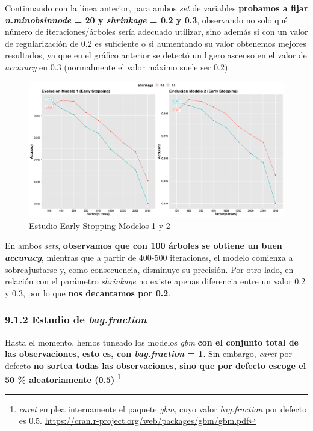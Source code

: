 \documentclass[
]{article}
\begin{document}
Continuando con la línea anterior, para ambos \emph{set} de variables
\textbf{probamos a fijar \emph{n.minobsinnode} = 20 y \emph{shrinkage} =
0.2 y 0.3}, observando no solo qué número de iteraciones/árboles sería
adecuado utilizar, sino además si con un valor de regularización de 0.2
es suficiente o si aumentando su valor obtenemos mejores resultados, ya
que en el gráfico anterior se detectó un ligero ascenso en el valor de
\emph{accuracy} en 0.3 (normalmente el valor máximo suele ser 0.2):

\begin{figure}[h!]

{\centering \includegraphics[width=0.99\linewidth,height=0.99\textheight,]{./charts/gradient_boosting/05_early_stopping} 

}

\caption{Estudio Early Stopping Modelos 1 y 2}\label{fig:unnamed-chunk-109}
\end{figure}

En ambos \emph{sets}, \textbf{observamos que con 100 árboles se obtiene
un buen \emph{accuracy}}, mientras que a partir de 400-500 iteraciones,
el modelo comienza a sobreajustarse y, como consecuencia, disminuye su
precisión. Por otro lado, en relación con el parámetro \emph{shrinkage}
no existe apenas diferencia entre un valor 0.2 y 0.3, por lo que
\textbf{nos decantamos por 0.2}.

\hypertarget{estudio-de-bag.fraction}{%
\subsubsection{\texorpdfstring{9.1.2 Estudio de
\emph{bag.fraction}}{9.1.2 Estudio de bag.fraction}}\label{estudio-de-bag.fraction}}

Hasta el momento, hemos tuneado los modelos \emph{gbm} \textbf{con el
conjunto total de las observaciones, esto es, con \emph{bag.fraction} =
1}. Sin embargo, \emph{caret} por defecto \textbf{no sortea todas las
observaciones, sino que por defecto escoge el 50 \% aleatoriamente
(0.5)} \footnote{\emph{caret} emplea internamente el paquete \emph{gbm},
  cuyo valor \emph{bag.fraction} por defecto es 0.5.
  \url{https://cran.r-project.org/web/packages/gbm/gbm.pdf}}
\end{document}
